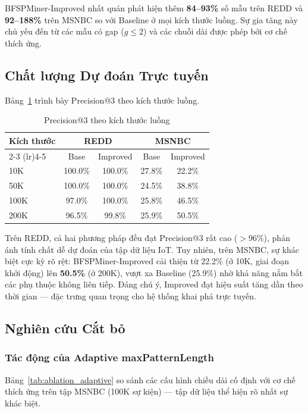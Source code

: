 \documentclass[conference]{IEEEtran}
\begin{document}
BFSPMiner-Improved nhất quán phát hiện thêm \textbf{84--93\%} số mẫu trên REDD và \textbf{92--188\%} trên MSNBC so với Baseline ở mọi kích thước luồng. Sự gia tăng này chủ yếu đến từ các mẫu có gap ($g \leq 2$) và các chuỗi dài được phép bởi cơ chế thích ứng.

\subsection{Chất lượng Dự đoán Trực tuyến}
Bảng~\ref{tab:hitrate_scale} trình bày Precision@3 theo kích thước luồng.

\begin{table}[htbp]
    \centering
    \caption{Precision@3 theo kích thước luồng}
    \label{tab:hitrate_scale}
    \begin{tabular}{lcccc}
        \toprule
        \multirow{2}{*}{\textbf{Kích thước}} & \multicolumn{2}{c}{\textbf{REDD}} & \multicolumn{2}{c}{\textbf{MSNBC}} \\
        \cmidrule(lr){2-3} \cmidrule(lr){4-5}
         & Base & Improved & Base & Improved \\
        \midrule
        10K  & 100.0\% & 100.0\% & 27.8\% & 22.2\% \\
        50K  & 100.0\% & 100.0\% & 24.5\% & 38.8\% \\
        100K & 97.0\%  & 100.0\% & 25.8\% & 46.5\% \\
        200K & 96.5\%  & 99.8\%  & 25.9\% & 50.5\% \\
        \bottomrule
    \end{tabular}
\end{table}

Trên REDD, cả hai phương pháp đều đạt Precision@3 rất cao ($>$96\%), phản ánh tính chất dễ dự đoán của tập dữ liệu IoT. Tuy nhiên, trên MSNBC, sự khác biệt cực kỳ rõ rệt: BFSPMiner-Improved cải thiện từ 22.2\% (ở 10K, giai đoạn khởi động) lên \textbf{50.5\%} (ở 200K), vượt xa Baseline (25.9\%) nhờ khả năng nắm bắt các phụ thuộc không liên tiếp. Đáng chú ý, Improved đạt hiệu suất tăng dần theo thời gian --- đặc trưng quan trọng cho hệ thống khai phá trực tuyến.

\subsection{Nghiên cứu Cắt bỏ}

\subsubsection{Tác động của Adaptive maxPatternLength}
Bảng~\ref{tab:ablation_adaptive} so sánh các cấu hình chiều dài cố định với cơ chế thích ứng trên tập MSNBC (100K sự kiện) --- tập dữ liệu thể hiện rõ nhất sự khác biệt.
\end{document}

